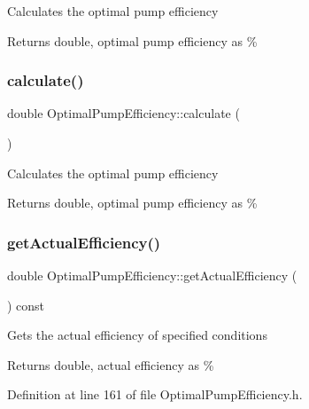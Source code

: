 Calculates the optimal pump efficiency \begin{DoxyReturn}{Returns}
double, optimal pump efficiency as \% 
\end{DoxyReturn}
\mbox{\label{class_optimal_pump_efficiency_ac40720d1fcdf40d8b364df37e58e7f4d}} 
\subsubsection{\texorpdfstring{calculate()}{calculate()}\hspace{0.1cm}{\footnotesize\ttfamily [3/3]}}
{\footnotesize\ttfamily double Optimal\+Pump\+Efficiency\+::calculate (\begin{DoxyParamCaption}{ }\end{DoxyParamCaption})}

Calculates the optimal pump efficiency \begin{DoxyReturn}{Returns}
double, optimal pump efficiency as \% 
\end{DoxyReturn}
\mbox{\label{class_optimal_pump_efficiency_aa2ac8a7c61bc28f82e30cb44b9c21008}} 
\subsubsection{\texorpdfstring{get\+Actual\+Efficiency()}{getActualEfficiency()}\hspace{0.1cm}{\footnotesize\ttfamily [1/3]}}
{\footnotesize\ttfamily double Optimal\+Pump\+Efficiency\+::get\+Actual\+Efficiency (\begin{DoxyParamCaption}{ }\end{DoxyParamCaption}) const\hspace{0.3cm}{\ttfamily [inline]}}

Gets the actual efficiency of specified conditions \begin{DoxyReturn}{Returns}
double, actual efficiency as \% 
\end{DoxyReturn}


Definition at line 161 of file Optimal\+Pump\+Efficiency.\+h.

